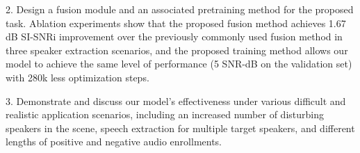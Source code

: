 2. Design a fusion module and an associated pretraining method for the proposed task. Ablation experiments show that the proposed fusion method achieves 1.67 dB SI-SNRi improvement over the previously commonly used fusion method in three speaker extraction scenarios, and the proposed training method allows our model to achieve the same level of performance (5 SNR-dB on the validation set) with 280k less optimization steps. 

3. Demonstrate and discuss our model's effectiveness under various difficult and realistic application scenarios, including an increased number of disturbing speakers in the scene, speech extraction for multiple target speakers, and different lengths of positive and negative audio enrollments. 


